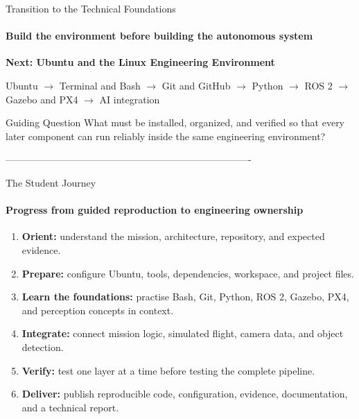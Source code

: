 





















\begin{frame}{Transition to the Technical Foundations}
    \framesubtitle{Build the environment before building the autonomous system}
    \begin{center}
        {\Large\bfseries\color{um6p-dark}
        Next: Ubuntu and the Linux Engineering Environment}
    \end{center}
    \vspace{0.35cm}
    \begin{center}
        \footnotesize
        Ubuntu
        $\rightarrow$
        Terminal and Bash
        $\rightarrow$
        Git and GitHub
        $\rightarrow$
        Python
        $\rightarrow$
        ROS 2
        $\rightarrow$ 
        Gazebo and PX4
        $\rightarrow$
        AI integration
    \end{center}
    \begin{exampleblock}{Guiding Question}
        What must be installed, organized, and verified so that every later component can run reliably inside the same engineering environment?
    \end{exampleblock}
\end{frame}


----------------------------------------------------------------------------
\begin{frame}{The Student Journey}
    \framesubtitle{Progress from guided reproduction to engineering ownership}
    \footnotesize
    \begin{enumerate}
        \setlength{\itemsep}{0.35em}
        \item \textbf{Orient:} understand the mission, architecture, repository, and expected evidence.
        \item \textbf{Prepare:} configure Ubuntu, tools, dependencies, workspace, and project files.
        \item \textbf{Learn the foundations:} practise Bash, Git, Python, ROS 2, Gazebo, PX4, and perception concepts in context.
        \item \textbf{Integrate:} connect mission logic, simulated flight, camera data, and object detection.
        \item \textbf{Verify:} test one layer at a time before testing the complete pipeline.
        \item \textbf{Deliver:} publish reproducible code, configuration, evidence, documentation, and a technical report.
    \end{enumerate}
\end{frame}

